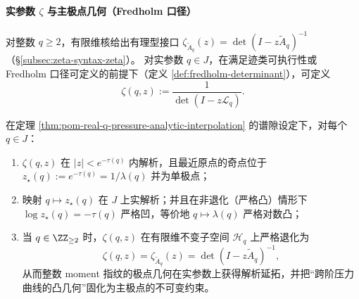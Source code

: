 








\paragraph{实参数 \texorpdfstring{$\zeta$}{zeta} 与主极点几何（Fredholm 口径）}
对整数 \(q\ge 2\)，有限维核给出有理型接口 \(\zeta_{\widetilde A_q}(z)=\det(I-z\widetilde A_q)^{-1}\)（\S\ref{subsec:zeta-syntax-zeta}）。
对实参数 \(q\in J\)，在满足迹类可执行性或 Fredholm 口径可定义的前提下（定义 \ref{def:fredholm-determinant}），可定义
\[
\zeta(q,z):=\frac{1}{\det(I-z\mathcal{L}_q)}.
\]

\begin{proposition}[主极点的解析运动与严格对数凸]\label{prop:pom-real-q-zeta-main-pole}
在定理 \ref{thm:pom-real-q-pressure-analytic-interpolation} 的谱隙设定下，对每个 \(q\in J\)：
\begin{enumerate}
  \item \(\zeta(q,z)\) 在 \(|z|<e^{-\tau(q)}\) 内解析，且最近原点的奇点位于
  \(
  z_\star(q):=e^{-\tau(q)}=1/\lambda(q)
  \)
  并为单极点；
  \item 映射 \(q\mapsto z_\star(q)\) 在 \(J\) 上实解析；并且在非退化（严格凸）情形下 \(\log z_\star(q)=-\tau(q)\) 严格凹，等价地 \(q\mapsto \lambda(q)\) 严格对数凸；
  \item 当 \(q\in\ZZ_{\ge 2}\) 时，\(\zeta(q,z)\) 在有限维不变子空间 \(\mathcal{H}_q\) 上严格退化为
  \[
  \zeta(q,z)=\zeta_{\widetilde A_q}(z)=\det(I-z\widetilde A_q)^{-1},
  \]
  从而整数 moment 指纹的极点几何在实参数上获得解析延拓，并把“跨阶压力曲线的凸几何”固化为主极点的不可变约束。
\end{enumerate}
\end{proposition}

